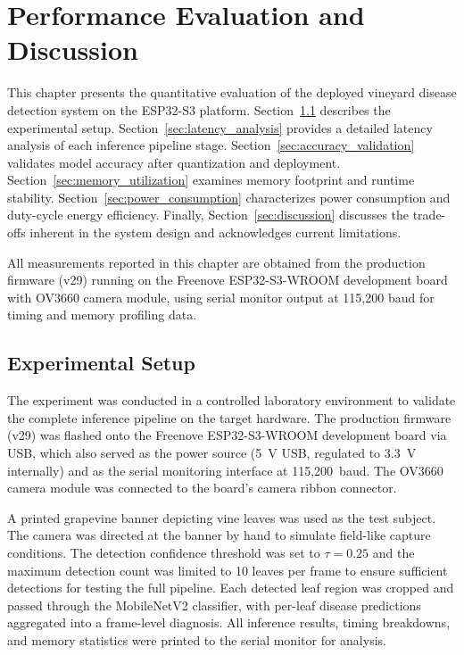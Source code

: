 \chapter{Performance Evaluation and Discussion}
\label{chap:performance_evaluation}

This chapter presents the quantitative evaluation of the deployed vineyard disease detection system on the ESP32-S3 platform. Section~\ref{sec:experimental_setup} describes the experimental setup. Section~\ref{sec:latency_analysis} provides a detailed latency analysis of each inference pipeline stage. Section~\ref{sec:accuracy_validation} validates model accuracy after quantization and deployment. Section~\ref{sec:memory_utilization} examines memory footprint and runtime stability. Section~\ref{sec:power_consumption} characterizes power consumption and duty-cycle energy efficiency. Finally, Section~\ref{sec:discussion} discusses the trade-offs inherent in the system design and acknowledges current limitations.

All measurements reported in this chapter are obtained from the production firmware (v29) running on the Freenove ESP32-S3-WROOM development board~\cite{freenove2024esp32s3} with OV3660 camera module, using serial monitor output at 115,200 baud for timing and memory profiling data.

\section{Experimental Setup}
\label{sec:experimental_setup}

The experiment was conducted in a controlled laboratory environment to validate the complete inference pipeline on the target hardware. The production firmware (v29) was flashed onto the Freenove ESP32-S3-WROOM development board via USB, which also served as the power source (5~V USB, regulated to 3.3~V internally) and as the serial monitoring interface at 115,200~baud. The OV3660 camera module was connected to the board's camera ribbon connector.

A printed grapevine banner depicting vine leaves was used as the test subject. The camera was directed at the banner by hand to simulate field-like capture conditions. The detection confidence threshold was set to $\tau = 0.25$ and the maximum detection count was limited to 10 leaves per frame to ensure sufficient detections for testing the full pipeline. Each detected leaf region was cropped and passed through the MobileNetV2 classifier, with per-leaf disease predictions aggregated into a frame-level diagnosis. All inference results, timing breakdowns, and memory statistics were printed to the serial monitor for analysis.

